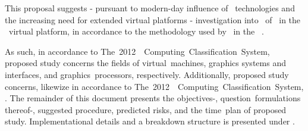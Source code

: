 \noindent
This proposal suggests - pursuant to  modern-day influence of \termgpu\ technologies and the increasing need for extended virtual platforms - investigation into \termparavirtualization\ of \termopengles\ in the \termsimics\ virtual platform, in accordance to the methodology used by \termgoogle\ in the \termandroid ~\termsdk .

As such, in accordance to The~2012~\termacm ~Computing~Classification~System, proposed study concerns the fields of virtual~machines, graphics systems and interfaces,  and graphics~processors, respectively. Additionally, proposed study concerns, likewize in accordance to The~2012~\termacm ~Computing~Classification~System, \termintel .
The remainder of this document presents the objectives-, question~formulations thereof-, suggested procedure, predicted risks, and the time~plan of proposed study.
Implementational details and a breakdown structure is presented under .
